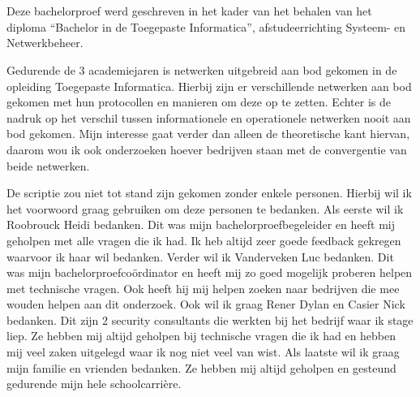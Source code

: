 
\chapter*{}
\label{ch:voorwoord}

Deze bachelorproef werd geschreven in het kader van het behalen van het diploma ``Bachelor in de Toegepaste Informatica'', afstudeerrichting Systeem- en Netwerkbeheer.

Gedurende de 3 academiejaren is netwerken uitgebreid aan bod gekomen in de opleiding Toegepaste Informatica. Hierbij zijn er verschillende netwerken aan bod gekomen met hun protocollen en manieren om deze op te zetten. Echter is de nadruk op het verschil tussen informationele en operationele netwerken nooit aan bod gekomen. Mijn interesse gaat verder dan alleen de theoretische kant hiervan, daarom wou ik ook onderzoeken hoever bedrijven staan met de convergentie van beide netwerken.

De scriptie zou niet tot stand zijn gekomen zonder enkele personen. Hierbij wil ik het voorwoord graag gebruiken om deze personen te bedanken. Als eerste wil ik Roobrouck Heidi bedanken. Dit was mijn bachelorproefbegeleider en heeft mij geholpen met alle vragen die ik had. Ik heb altijd zeer goede feedback gekregen waarvoor ik haar wil bedanken. Verder wil ik Vanderveken Luc bedanken. Dit was mijn bachelorproefcoördinator en heeft mij zo goed mogelijk proberen helpen met technische vragen. Ook heeft hij mij helpen zoeken naar bedrijven die mee wouden helpen aan dit onderzoek. Ook wil ik graag Rener Dylan en Casier Nick bedanken. Dit zijn 2 security consultants die werkten bij het bedrijf waar ik stage liep. Ze hebben mij altijd geholpen bij technische vragen die ik had en hebben mij veel zaken uitgelegd waar ik nog niet veel van wist. Als laatste wil ik graag mijn familie en vrienden bedanken. Ze hebben mij altijd geholpen en gesteund gedurende mijn hele schoolcarrière.

